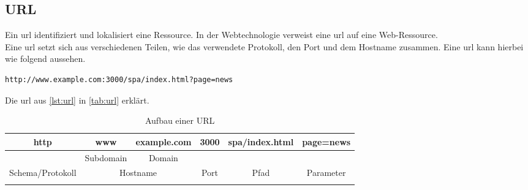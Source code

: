 \subsection{URL}
\label{sec:url}
Ein \acf{url} identifiziert und lokalisiert eine Ressource. In der Webtechnologie verweist eine \ac{url} auf eine Web-Ressource. \\
Eine \ac{url} setzt sich aus verschiedenen Teilen, wie das verwendete Protokoll, den Port und dem Hostname  zusammen. Eine \ac{url} kann hierbei wie folgend aussehen.

\begin{lstlisting}[style=jcr, caption=Eine URL, label=lst:url]
http://www.example.com:3000/spa/index.html?page=news
\end{lstlisting}

Die \ac{url} aus \autoref{lst:url} in \autoref{tab:url} erklärt.

\begin{longtable}{|*6{c|}} 
	
	
	\hline 
	http & www & example.com & 3000 & spa/index.html & page=news\\ 
	
	\hline 
	 & Subdomain\index{Subdomain|see{Domain Subdomain}} & Domain\index{Domain} & & & \\
	\hline 
	Schema/Protokoll & \multicolumn{2}{c|}{Hostname} & Port & Pfad & Parameter\\
	\hline
	\caption{Aufbau einer URL}\label{tab:url}
\end{longtable}
